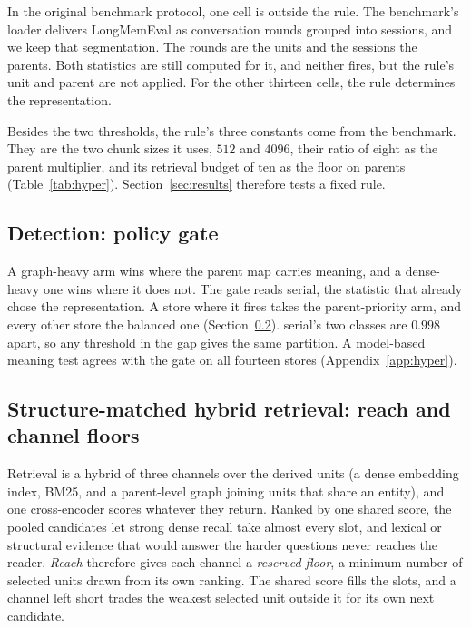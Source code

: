 \documentclass{article}
\newcommand{\serial}{\textsf{serial}}
\begin{document}
In the original benchmark protocol, one cell is outside the rule. The benchmark's loader delivers LongMemEval as conversation rounds grouped
into sessions, and we keep that segmentation. The rounds are the units and the sessions the parents. Both
statistics are still computed for it, and neither fires, but the rule's unit and parent are not applied.
For the other thirteen cells, the rule determines the representation.

Besides the two thresholds, the rule's three constants come from the benchmark. They are the two chunk sizes it uses, $512$ and $4096$, their ratio of eight as the parent multiplier, and its retrieval budget of ten as the floor on parents (Table~\ref{tab:hyper}). Section~\ref{sec:results} therefore tests a fixed rule.

\subsection{Detection: policy gate}\label{sec:gate}

A graph-heavy arm wins where the parent map
carries meaning, and a dense-heavy one wins where it does not. The gate reads \serial{}, the statistic that
already chose the representation. A store where it fires takes the parent-priority arm, and every other store
the balanced one (Section~\ref{sec:read}). \serial{}'s two classes are $0.998$ apart, so any threshold in the gap gives the same partition. A model-based meaning test agrees with the gate on all fourteen stores (Appendix~\ref{app:hyper}).

\subsection{Structure-matched hybrid retrieval: reach and channel floors}\label{sec:read}

Retrieval is a hybrid of three channels over the derived units (a dense embedding index, BM25, and a parent-level graph joining
units that share an entity), and one cross-encoder scores whatever they
return. Ranked by one shared score, the pooled candidates
let strong dense recall take almost every slot, and lexical or structural evidence that would answer the
harder questions never reaches the reader. \emph{Reach} therefore gives each channel a \emph{reserved floor}, a minimum number of selected units drawn from its own ranking. The shared score fills the slots, and a channel left short trades the weakest selected unit outside it for its own next candidate.
\end{document}
